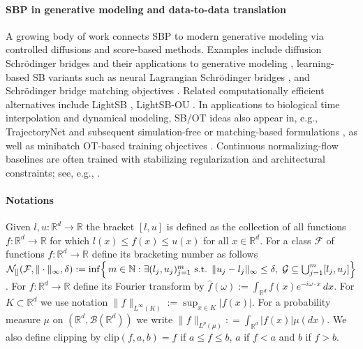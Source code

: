 \documentclass[11pt]{article}
\theoremstyle{remark}
\numberwithin{equation}{section}
\newcommand{\R}{\mathbb{R}}
\def\clip{\mathrm{clip}}
\begin{document}
\paragraph{SBP in generative modeling and data-to-data translation}
A growing body of work connects SBP to modern generative modeling via controlled diffusions and
score-based methods. Examples include diffusion Schr\"odinger bridges and their applications to
generative modeling \citep{DeBortoliThorntonHengDoucet2021}, learning-based SB variants such as
neural Lagrangian Schr\"odinger bridges \citep{KoshizukaSato2022}, and Schr\"odinger bridge matching
objectives \citep{ShiDeBortoliCampbellDoucet2023}.
Related computationally efficient alternatives include LightSB \citep{KorotinGushchinBurnaev2024}, LightSB-OU 
\citep{puchkin2025tightboundsschrodingerpotential}. 
In applications to biological time interpolation and dynamical modeling, SB/OT ideas also appear in,
e.g., TrajectoryNet \citep{TongHuangWolfVanDijkKrishnaswamy2020} and subsequent simulation-free or
matching-based formulations \citep{TongEtAl2023b}, as well as minibatch OT-based training objectives
\citep{TongEtAl2023a}. Continuous normalizing-flow baselines are often trained with stabilizing
regularization and architectural constraints; see, e.g., \citet{FinlayJacobsenNurbekyanOberman2020}.



\paragraph{Notations}
Given $l, u: \R^d \to \R$ the bracket $[l,u]$ is defined as the collection of all functions $f : \R^d \to \R$ for which $l(x)  \le f(x)  \le u(x)$ for all $x \in \R^d$. For a class $\mathcal F$ of functions $f: \R^d \to \R$ define its bracketing number as follows $\mathcal{N}_{[]}\!\left(\mathcal{F},\|\cdot\|_\infty,\delta\right)
:= \inf\Bigl\{\, m\in\mathbb{N} :
\exists (l_j,u_j)_{j=1}^m\ \text{s.t. } \|u_j-l_j\|_\infty \le \delta,\ 
\mathcal{G}\subseteq \bigcup_{j=1}^m [l_j,u_j] \Bigr\}$. For $f: \R^d \to \R$ define its Fourier transform by $\widehat{f}(\omega):=\int_{\R^d} f(x)e^{-i\omega\cdot x}\,dx$. 
For $K \subset \R^d$ we use notation $\|f\|_{L^\infty(K)}:=\sup_{x \in K} |f(x)|$. For a probability measure $\mu$ on $(\R^d, \mathcal B(\R^d))$ we write $\|f\|_{L^p(\mu)}: = \int_{\R^d} |f(x)| \mu(dx)$. We also define clipping by $\clip(f, a, b) = f$ if $a \le f \le b$, $a$ if $f < a$ and $b$ if $f > b$. 
\end{document}
